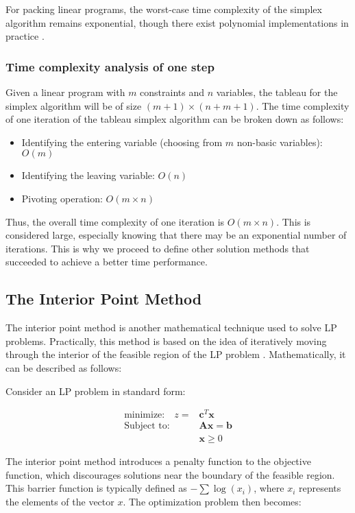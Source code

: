 For packing linear programs, the worst-case time complexity of the simplex algorithm remains exponential, though there exist polynomial implementations in practice \parencite{stille2010solution}.

\subsubsection{Time complexity analysis of one step}
Given a linear program with \( m \) constraints and \( n \) variables, the tableau for the
simplex algorithm will be of size \( (m+1) \times (n+m+1) \).
The time complexity of one iteration of the tableau simplex algorithm can be broken down as follows:

\begin{itemize}
    \item Identifying the entering variable (choosing from $m$ non-basic variables): \( O(m) \)
    \item Identifying the leaving variable: \( O(n) \)
    \item Pivoting operation: \( O(m \times n) \)
\end{itemize}

Thus, the overall time complexity of one iteration is \( O(m \times n) \). This is considered large, especially knowing that there may be an exponential number of iterations. This is why we proceed to define other solution methods that succeeded to achieve a better time performance.

\subsection{The Interior Point Method}
The interior point method is another mathematical technique used to solve LP problems. Practically, this method is based on the idea of iteratively moving through the interior of the feasible region of the LP problem \parencite{alizadeh1995interior}. Mathematically, it can be described as follows:

Consider an LP problem in standard form:

\[
    \begin{aligned}
        \text{minimize:} \quad   z = & \mathbf{c}^T\mathbf{x}   \\
        \text{Subject to:} \quad     & \mathbf{Ax} = \mathbf{b} \\
                                     & \mathbf{x} \geq 0
    \end{aligned}
\]

The interior point method introduces a penalty function to the objective function, which discourages solutions near the boundary of the feasible region. This barrier function is typically defined as $-\sum \log(x_i)$, where $x_i$ represents the elements of the vector $x$.
The optimization problem then becomes:

